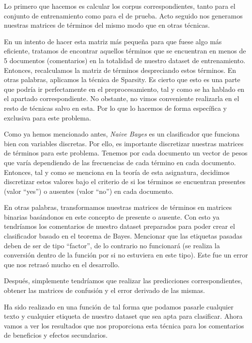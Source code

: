 \documentclass[spanish,]{article}
\begin{document}
Lo primero que hacemos es calcular los corpus correspondientes, tanto
para el conjunto de entrenamiento como para el de prueba. Acto seguido
nos generamos nuestras matrices de términos del mismo modo que en otras
técnicas.

En un intento de hacer esta matriz más pequeña para que fuese algo más
eficiente, tratamos de encontrar aquellos términos que se encuentran en
menos de 5 documentos (comentarios) en la totalidad de nuestro dataset
de entrenamiento. Entonces, recalculamos la matriz de términos
despreciando estos términos. En otras palabras, aplicamos la técnica de
Sparsity. Es cierto que esto es una parte que podría ir perfectamente en
el preprocesamiento, tal y como se ha hablado en el apartado
correspondiente. No obstante, no vimos conveniente realizarla en el
resto de técnicas salvo en esta. Por lo que lo hacemos de forma
específica y exclusiva para este problema.

Como ya hemos mencionado antes, \emph{Naive Bayes} es un clasificador
que funciona bien con variables discretas. Por ello, es importante
discretizar nuestras matrices de términos para este problema. Tenemos
por cada documento un vector de pesos que varía dependiendo de las
frecuencias de cada término en cada documento. Entonces, tal y como se
menciona en la teoría de esta asignatura, decidimos discretizar estos
valores bajo el criterio de si los términos se encuentran presentes
(valor ``yes'') o ausentes (valor ``no'') en cada documento.

En otras palabras, transformamos nuestras matrices de términos en
matrices binarias basándonos en este concepto de presente o ausente. Con
esto ya tendríamos los comentarios de nuestro dataset preparados para
poder crear el clasificador basado en el teorema de Bayes. Mencionar que
las etiquetas pasadas deben de ser de tipo ``factor'', de lo contrario
no funcionará (se realiza la conversión dentro de la función por si no
estuviera en este tipo). Este fue un error que nos retrasó mucho en el
desarrollo.

Después, simplemente tendríamos que realizar las predicciones
correspondientes, obtener las matrices de confusión y el error derivado
de las mismas.

Ha sido realizado en una función de tal forma que podamos pasarle
cualquier texto y cualquier etiqueta de nuestro dataset que sea apta
para clasificar. Ahora vamos a ver los resultados que nos proporciona
esta técnica para los comentarios de beneficios y efectos secundarios.
\end{document}
